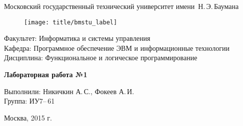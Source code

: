 
\thispagestyle{empty}

\begin{center}
	\Large
	Московский государственный технический университет имени~Н.\,Э.\,Баумана
\end{center}

\begin{figure}[h!]
	\begin{center}
		\texttt{[image: title/bmstu\_label]}
	\end{center}
\end{figure}

{\large
\noindent
Факультет: Информатика и системы управления\\[2mm]
\noindent
Кафедра: Программное обеспечение ЭВМ и информационные технологии\\[2mm]
\noindent
Дисциплина: Функциональное и логическое программирование
\vspace{1.5cm}}

\begin{center}
	\Large
	\textbf{Лабораторная работа №1}
\end{center}
\vfill

\hfill\begin{minipage}{0.6\textwidth}
	Выполнили: Никичкин А.\,С., Фокеев А.\,И.\\
	Группа: ИУ7--\,61
\end{minipage}
\vfill

\begin{center}
	Москва, 2015 г.
\end{center}